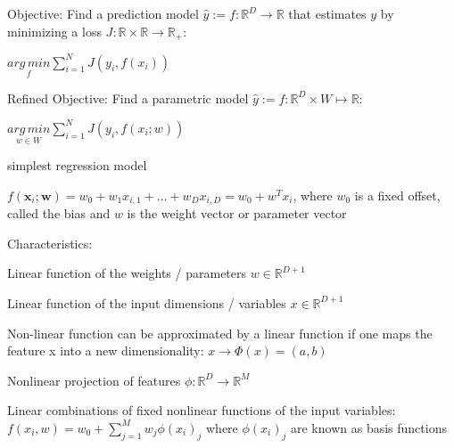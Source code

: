 \documentclass[landscape, a4paper]{article}
\begin{document}
\begin{minipage}[t]{0.2\linewidth}
\begin{betterlist}
\begin{betterlist}
\begin{betterlist}
			\end{betterlist}
			\item \alert{Objective:} Find a prediction model $\hat y := f : \mathbb{R}^D \rightarrow \mathbb{R}$ that estimates $y$ by minimizing a loss $J : \mathbb{R} \times \mathbb{R} \rightarrow \mathbb{R}_+$:
			\begin{betterlist}
				\item $\displaystyle \underset{f}{arg\,min} \sum^N_{i=1} J(y_i, f(x_i))$
			\end{betterlist}
			\item \alert{ Refined Objective:}  Find a parametric model $\hat y := f : \mathbb{R}^D \times  W \mapsto \mathbb{R}$:
			\begin{betterlist}
				\item $\displaystyle \underset{w\in W}{arg\,min} \sum^N_{i=1} J(y_i, f(x_i; w))$
			\end{betterlist}
		\end{betterlist}
		\item {}
		\begin{betterlist}
			\item simplest regression model
			\item $f\left(\mathbf{x}_i ; \mathbf{w}\right)=w_0+w_1 x_{i, 1}+\ldots+w_D x_{i, D}=w_0+w^T x_i$, where $w_0$ is a fixed offset, called the \alert{bias} and $w$ is the \alert{weight vector} or \alert{parameter vector}
			\begin{betterlist}
				\item \alert{Characteristics:}
				\begin{betterlist}
					\item Linear function of the weights / parameters $w \in \mathbb{R}^{D+1}$
					\item Linear function of the input dimensions / variables $x \in \mathbb{R}^{D+1}$
				\end{betterlist}
			\end{betterlist}
			\item {} \alert{Non-linear function} can be approximated by a linear function if one maps the feature x into a new dimensionality: $x\rightarrow \Phi(x) = (a, b)$
			\begin{betterlist}
				\item \script{90}{Example}
				\item Nonlinear projection of features $\phi: \mathbb{R}^D\rightarrow \mathbb{R}^M$
				\item Linear combinations of fixed \alert{nonlinear functions} of the input variables: $\displaystyle f(x_i, w) = w_0 + \sum^M_{j=1} w_j\phi(x_i)_j$ where $\phi(x_i)_j$ are known as \alert{basis functions}

\end{betterlist}
\end{betterlist}
\end{betterlist}
\end{minipage}
\end{document}
